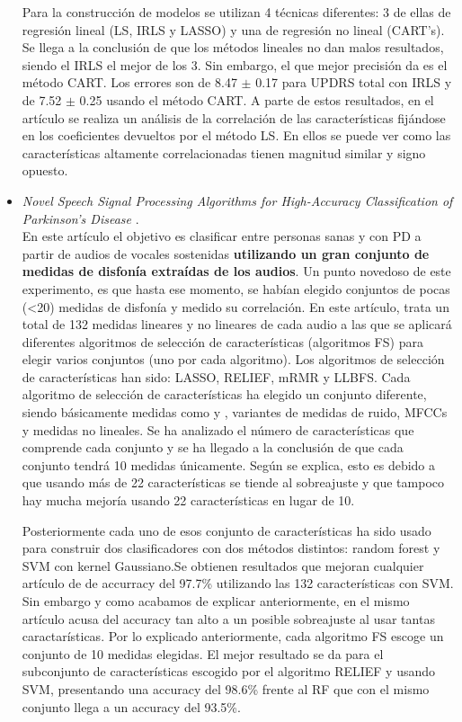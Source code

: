 \begin{itemize}
	 Para la construcción de modelos se utilizan 4 técnicas diferentes: 3 de ellas de regresión lineal (LS, IRLS y LASSO) y una de regresión no lineal (CART's). Se llega a la conclusión de que los métodos lineales no dan malos resultados, siendo el IRLS el mejor de los 3. Sin embargo, el que mejor precisión da es el método CART. Los errores son de 8.47 $\pm$ 0.17 para UPDRS total con IRLS y de 7.52 $\pm$ 0.25 usando el método CART. A parte de estos resultados, en el artículo se realiza un análisis de la correlación de las características fijándose en los coeficientes devueltos por el método LS. En ellos se puede ver como las características altamente correlacionadas tienen magnitud similar y signo opuesto. 
	
	\item \textit{Novel Speech Signal Processing Algorithms for High-Accuracy Classification of Parkinson's Disease} \cite{MxLtNovel}.\\
	En este artículo el objetivo es clasificar entre personas sanas y con PD a partir de audios de vocales sostenidas \textbf{utilizando un gran conjunto de medidas de disfonía extraídas de los audios}. Un punto novedoso de este experimento, es que hasta ese momento, se habían elegido conjuntos de pocas (<20) medidas de disfonía y medido su correlación. En este artículo, trata un total de 132 medidas lineares y no lineares de cada audio a las que se aplicará diferentes algoritmos de selección de características (algoritmos FS) para elegir varios conjuntos (uno por cada algoritmo). Los algoritmos de selección de características han sido: LASSO, RELIEF, mRMR y LLBFS. Cada algoritmo de selección de características ha elegido un conjunto diferente, siendo básicamente medidas como  y , variantes de medidas de ruido, MFCCs y medidas no lineales. Se ha analizado el número de características que comprende cada conjunto y se ha llegado a la conclusión de que cada conjunto tendrá 10 medidas únicamente. Según se explica, esto es debido a que usando más de 22 características se tiende al sobreajuste y que tampoco hay mucha mejoría usando 22 características en lugar de 10.
	
	Posteriormente cada uno de esos conjunto de características ha sido usado para construir dos clasificadores con dos métodos distintos: random forest y SVM con kernel Gaussiano.Se obtienen resultados que mejoran cualquier artículo de de accurracy del 97.7\% utilizando las 132 características con SVM. Sin embargo y como acabamos de explicar anteriormente, en el mismo artículo acusa del accuracy tan alto a un posible sobreajuste al usar tantas caractarísticas. Por lo explicado anteriormente, cada algoritmo FS escoge un conjunto de 10 medidas elegidas. El mejor resultado se da para el subconjunto de características escogido por el algoritmo RELIEF y usando SVM, presentando una accuracy del 98.6\% frente al RF que con el mismo conjunto llega a un accuracy del 93.5\%. 
	

\end{itemize}

